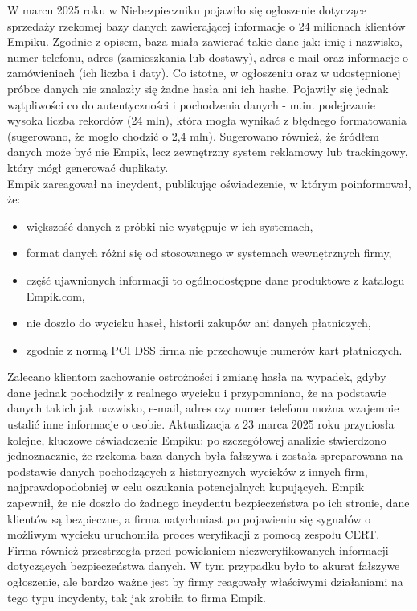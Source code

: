 W marcu 2025 roku w Niebezpieczniku\cite{empik} pojawiło się ogłoszenie dotyczące sprzedaży rzekomej bazy danych zawierającej informacje o 24 milionach klientów Empiku. Zgodnie z opisem, baza miała zawierać takie dane jak: imię i nazwisko, numer telefonu, adres (zamieszkania lub dostawy), adres e-mail oraz informacje o zamówieniach (ich liczba i daty). Co istotne, w ogłoszeniu oraz w udostępnionej próbce danych nie znalazły się żadne hasła ani ich hashe.
Pojawiły się jednak wątpliwości co do autentyczności i pochodzenia danych - m.in. podejrzanie wysoka liczba rekordów (24 mln), która mogła wynikać z błędnego formatowania (sugerowano, że mogło chodzić o 2,4 mln). Sugerowano również, że źródłem danych może być nie Empik, lecz zewnętrzny system reklamowy lub trackingowy, który mógł generować duplikaty.\\
Empik zareagował na incydent, publikując oświadczenie, w którym poinformował, że:
\begin{itemize}
  \item większość danych z próbki nie występuje w ich systemach,
  \item format danych różni się od stosowanego w systemach wewnętrznych firmy,
  \item część ujawnionych informacji to ogólnodostępne dane produktowe z katalogu Empik.com,
  \item nie doszło do wycieku haseł, historii zakupów ani danych płatniczych,
  \item zgodnie z normą PCI DSS firma nie przechowuje numerów kart płatniczych.
\end{itemize}

Zalecano klientom zachowanie ostrożności i zmianę hasła na wypadek, gdyby dane jednak pochodziły z realnego wycieku i przypomniano, że na podstawie danych takich jak nazwisko, e-mail, adres czy numer telefonu można wzajemnie ustalić inne informacje o osobie.
Aktualizacja z 23 marca 2025 roku przyniosła kolejne, kluczowe oświadczenie Empiku: po szczegółowej analizie stwierdzono jednoznacznie, że rzekoma baza danych była fałszywa i została spreparowana na podstawie danych pochodzących z historycznych wycieków z innych firm, najprawdopodobniej w celu oszukania potencjalnych kupujących.
Empik zapewnił, że nie doszło do żadnego incydentu bezpieczeństwa po ich stronie, dane klientów są bezpieczne, a firma natychmiast po pojawieniu się sygnałów o możliwym wycieku uruchomiła proces weryfikacji z pomocą zespołu CERT. Firma również przestrzegła przed powielaniem niezweryfikowanych informacji dotyczących bezpieczeństwa danych.
W tym przypadku było to akurat fałszywe ogłoszenie, ale bardzo ważne jest by firmy reagowały właściwymi działaniami na tego typu incydenty, tak jak zrobiła to firma Empik.

